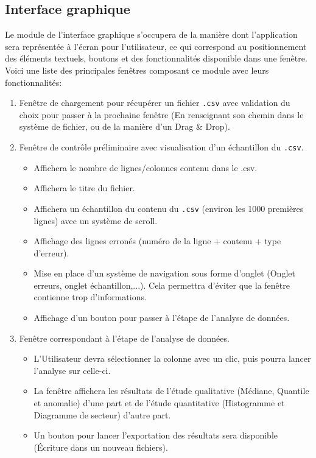 		\subsection{Interface graphique}
			Le module de l'interface graphique s'occupera de la manière dont l'application sera représentée à l'écran pour l'utilisateur, ce qui correspond au positionnement des éléments textuels, boutons et des fonctionnalités disponible dans une fenêtre. Voici une liste des principales fenêtres composant ce module avec leurs fonctionnalités:
			\begin{enumerate}
			\item Fenêtre de chargement pour récupérer un fichier \lstinline!.csv! avec validation du choix pour passer à la prochaine fenêtre (En renseignant son chemin dans le système de fichier, ou de la manière d'un Drag \& Drop).
			\item Fenêtre de contrôle préliminaire avec visualisation d'un échantillon du \lstinline!.csv!.		
				\begin{itemize}
				\item Affichera le nombre de lignes/colonnes contenu dans le .csv.
				\item Affichera le titre du fichier.
				\item Affichera un échantillon du contenu du \lstinline!.csv! (environ les 1000 premières lignes) avec un système de scroll.
				\item Affichage des lignes erronés (numéro de la ligne + contenu + type d'erreur).
				\item Mise en place d'un système de navigation sous forme d'onglet (Onglet erreurs, onglet échantillon,...). Cela permettra d'éviter que la fenêtre contienne trop d'informations.
				\item Affichage d'un bouton pour passer à l'étape de l'analyse de données.
				\end{itemize}
			\item Fenêtre correspondant à l'étape de l'analyse de données.
				\begin{itemize}
				\item L'Utilisateur devra sélectionner la colonne avec un clic, puis pourra lancer l'analyse sur celle-ci.
				\item La fenêtre affichera les résultats de l'étude qualitative (Médiane, Quantile et anomalie) d'une part et de l'étude quantitative (Histogramme et Diagramme de secteur) d'autre part.
				\item Un bouton pour lancer l'exportation des résultats sera disponible (Écriture dans un nouveau fichiers).
				\end{itemize}
			\end{enumerate}
		
		
	

